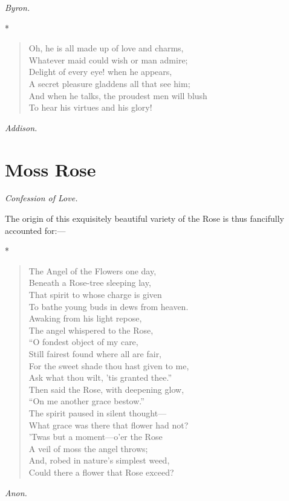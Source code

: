 \documentclass[11pt,twoside]{article}
\newcommand\flower[2]{\section*{#1}\addcontentsline{toc}{section}{#1}%
  \noindent\textit{#2.}\par\medskip}
\newcommand\stars{\begin{center}*\quad*\quad*\end{center}}
\newcommand\by[1]{\par\hfill\textit{#1}\par}
\begin{document}
\by{Byron.}

\stars

\begin{verse}
Oh, he is all made up of love and charms,\\
Whatever maid could wish or man admire;\\
Delight of every eye! when he appears,\\
A secret pleasure gladdens all that see him;\\
And when he talks, the proudest men will blush\\
To hear his virtues and his glory!
\end{verse}

\by{Addison.}

\flower{Moss Rose}{Confession of Love}

The origin of this exquisitely beautiful variety of the Rose is thus fancifully accounted for:---

\stars

\begin{verse}
The Angel of the Flowers one day,\\
Beneath a Rose-tree sleeping lay,\\
That spirit to whose charge is given\\
To bathe young buds in dews from heaven.\\
Awaking from his light repose,\\
The angel whispered to the Rose,\\
“O fondest object of my care,\\
Still fairest found where all are fair,\\
For the sweet shade thou hast given to me,\\
Ask what thou wilt, ’tis granted thee.”\\
Then said the Rose, with deepening glow,\\
“On me another grace bestow.”\\
The spirit paused in silent thought---\\
What grace was there that flower had not?\\
’Twas but a moment---o’er the Rose\\
A veil of moss the angel throws;\\
And, robed in nature’s simplest weed,\\
Could there a flower that Rose exceed?
\end{verse}

\by{Anon.}
\end{document}
